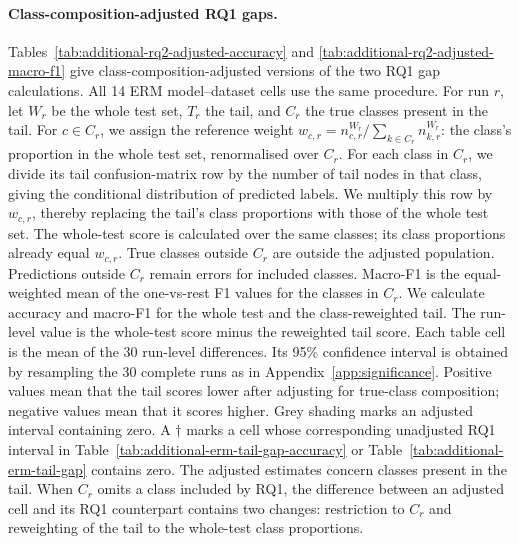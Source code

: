 \paragraph{Class-composition-adjusted RQ1 gaps.}
Tables~\ref{tab:additional-rq2-adjusted-accuracy} and \ref{tab:additional-rq2-adjusted-macro-f1} give class-composition-adjusted versions of the two RQ1 gap calculations. All 14 ERM model--dataset cells use the same procedure.
For run $r$, let $W_r$ be the whole test set, $T_r$ the tail, and $C_r$ the true classes present in the tail. For $c\in C_r$, we assign the reference weight $w_{c,r}=n^{W_r}_{c,r}/\sum_{k\in C_r}n^{W_r}_{k,r}$: the class's proportion in the whole test set, renormalised over $C_r$.
For each class in $C_r$, we divide its tail confusion-matrix row by the number of tail nodes in that class, giving the conditional distribution of predicted labels. We multiply this row by $w_{c,r}$, thereby replacing the tail's class proportions with those of the whole test set. The whole-test score is calculated over the same classes; its class proportions already equal $w_{c,r}$. True classes outside $C_r$ are outside the adjusted population. Predictions outside $C_r$ remain errors for included classes. Macro-F1 is the equal-weighted mean of the one-vs-rest F1 values for the classes in $C_r$.
We calculate accuracy and macro-F1 for the whole test and the class-reweighted tail. The run-level value is the whole-test score minus the reweighted tail score. Each table cell is the mean of the 30 run-level differences. Its 95\% confidence interval is obtained by resampling the 30 complete runs as in Appendix~\ref{app:significance}.
Positive values mean that the tail scores lower after adjusting for true-class composition; negative values mean that it scores higher. Grey shading marks an adjusted interval containing zero. A $\dagger$ marks a cell whose corresponding unadjusted RQ1 interval in Table~\ref{tab:additional-erm-tail-gap-accuracy} or Table~\ref{tab:additional-erm-tail-gap} contains zero.
The adjusted estimates concern classes present in the tail. When $C_r$ omits a class included by RQ1, the difference between an adjusted cell and its RQ1 counterpart contains two changes: restriction to $C_r$ and reweighting of the tail to the whole-test class proportions.

